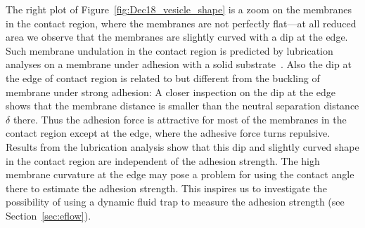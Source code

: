 \documentclass[prf,superscriptaddress,showpacs]{revtex4-1}
\begin{document}
The right plot of Figure~\ref{fig:Dec18_vesicle_shape} is a zoom on the
membranes in the contact region, where the membranes are not perfectly
flat---at all reduced area we observe that the membranes are slightly
curved with a dip at the edge.  Such membrane undulation in the contact
region is predicted by lubrication analyses on a membrane under adhesion
with a solid substrate~\cite{BlountMiksisDavis2013_PRSa,
YoungStone2017_PRF}.  Also the dip at the edge of contact region is
related to but different from the buckling of membrane under strong
adhesion: A closer inspection on the dip at the edge shows that the
membrane distance is smaller than the neutral separation distance
$\delta$ there. Thus the adhesion force is attractive for most of the
membranes in the contact region except at the edge, where the adhesive
force turns repulsive.  Results from the lubrication analysis show that
this dip and slightly curved shape in the contact region are independent
of the adhesion strength. The high membrane curvature at the edge may
pose a problem for using the contact angle there to estimate the
adhesion strength. This inspires us to investigate the possibility of
using a dynamic fluid trap to measure the adhesion strength (see
Section~\ref{sec:eflow}).
\end{document}
